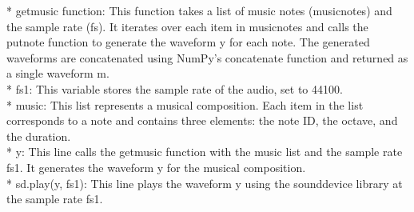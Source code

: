 \documentclass[12pt]{article}
\begin{document}
* getmusic function: This function takes a list of music notes (musicnotes) and the sample rate (fs). It iterates over each item in musicnotes and calls the putnote function to generate the waveform y for each note. The generated waveforms are concatenated using NumPy's concatenate function and returned as a single waveform m.
\\
* fs1: This variable stores the sample rate of the audio, set to 44100.
\\
* music: This list represents a musical composition. Each item in the list corresponds to a note and contains three elements: the note ID, the octave, and the duration.
\\
* y: This line calls the getmusic function with the music list and the sample rate fs1. It generates the waveform y for the musical composition.
\\
* sd.play(y, fs1): This line plays the waveform y using the sounddevice library at the sample rate fs1.
\end{document}
